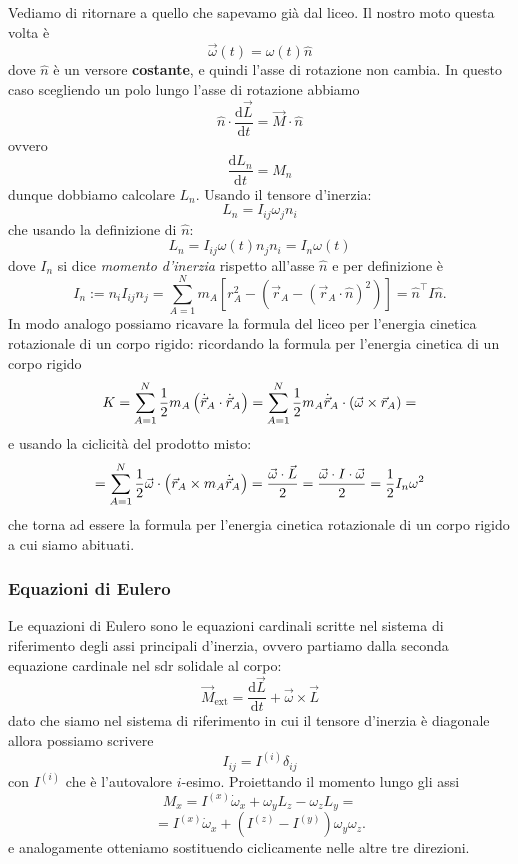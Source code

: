 \documentclass[11pt]{scrartcl}
\newcommand{\dif}{\text{d}}
\newcommand{\posit}{\vec{r}}
\newcommand{\veloc}{\dot{\vec{r}}}
\begin{document}
	Vediamo di ritornare a quello che sapevamo già dal liceo. Il nostro moto questa volta è
	$$\vec{\omega}(t)=\omega(t)\hat{n}$$
	dove $\hat{n}$ è un versore \textbf{costante}, e quindi l'asse di rotazione non cambia. In questo caso scegliendo un polo lungo l'asse di rotazione abbiamo
	$$\hat{n}\cdot\frac{\dif \vec{L}}{\dif t}=\vec{M}\cdot\hat{n}$$
	ovvero
	$$\frac{\dif L_n}{\dif t}=M_n$$
	dunque dobbiamo calcolare $L_n$. Usando il tensore d'inerzia:
	$$L_n=I_{ij}\omega_j n_{i}$$
	che usando la definizione di $\hat{n}$:
	$$L_n=I_{ij}\omega(t)n_j n_i=I_n \omega(t)$$
	dove $I_n$ si dice \textit{momento d'inerzia} rispetto all'asse $\hat{n}$ e per definizione è 
	$$I_n:=n_{i}I_{ij}n_j=\sum_{A=1}^N m_A\left[r_A^2-\left(\posit_A-\left(\posit_A\cdot\hat{n}\right)^2\right)\right]=\hat{n}^\intercal I \hat{n}.$$
	In modo analogo possiamo ricavare la formula del liceo per l'energia cinetica rotazionale di un corpo rigido: ricordando la formula per l'energia cinetica di un corpo rigido 
	$$K=\sum_{A=1}^{N}\half m_A \left(\veloc_A\cdot\veloc_A\right)=\sum_{A=1}^{N}\half m_A \veloc_A\cdot \left(\vec{\omega}\times \posit_A\right)=$$
	e usando la ciclicità del prodotto misto:
	$$=\sum_{A=1}^{N}\half\vec{\omega}\cdot \left(\posit_A \times m_A\veloc_A\right)=\frac{\vec{\omega}\cdot\vec{L}}{2}=\frac{\vec{\omega}\cdot I \cdot \vec{\omega}}{2}=\frac{1}{2}I_n \omega^2$$
	che torna ad essere la formula per l'energia cinetica rotazionale di un corpo rigido a cui siamo abituati.
	
	\subsubsection{Equazioni di Eulero}
	Le equazioni di Eulero sono le equazioni cardinali scritte nel sistema di riferimento degli assi principali d'inerzia, ovvero partiamo dalla seconda equazione cardinale nel sdr solidale al corpo:
	$$\vec{M}_\text{ext}=\frac{\dif \vec{L}}{\dif t}+\vec{\omega}\times\vec{L}$$
	dato che siamo nel sistema di riferimento in cui il tensore d'inerzia è diagonale allora possiamo scrivere
	$$I_{ij}=I^{(i)}\delta_{ij}$$
	con $I^{(i)}$ che è l'autovalore $i$-esimo. Proiettando il momento lungo gli assi
	$$M_x=I^{(x)}\dot{\omega}_x+\omega_yL_z-\omega_zL_y=$$
	$$=I^{(x)}\dot{\omega}_x+\left(I^{(z)}-I^{(y)}\right)\omega_y\omega_z.$$
	e analogamente otteniamo sostituendo ciclicamente nelle altre tre direzioni.
\end{document}
